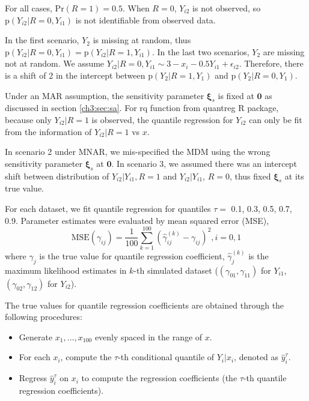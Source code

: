 \documentclass[useAMS,usenatbib,referee]{biom}
\newcommand{\pr}{\mbox{p}}
\newcommand{\prob}{\mbox{Pr}}
\begin{document}
For all cases, $\prob (R = 1) = 0.5$.
When $R = 0$, $Y_{i2}$ is not observed, so $\pr(Y_{i2}| R = 0, Y_{i1})$ is not identifiable from observed data.

In the first scenario, $Y_2$ is missing at random, thus $\pr(Y_{i2} | R = 0, Y_{i1}) = \pr(Y_{i2}|R = 1, Y_{i1}) $.
In the last two scenarios, $Y_2$ are missing not at random.
We assume $Y_{i2}| R = 0, Y_{i1} \sim 3 - x_i - 0.5Y_{i1} + \epsilon_{i2}$.
Therefore, there is a shift of 2 in the intercept between $\pr(Y_2|R = 1, Y_1)$ and $\pr(Y_2|R = 0, Y_1)$.

Under an MAR assumption, the sensitivity parameter $\bm \xi_s$ is fixed at $\bm 0$ as discussed in section \ref{ch3:sec:sa}.
For rq function from quantreg R package, because only $Y_{i2}|R = 1$ is observed, the quantile regression for $Y_{i2}$ can only be fit from the information of $Y_{i2}|R = 1$ vs $x$.

In scenario 2 under MNAR, we mis-specified the MDM using the wrong sensitivity parameter $\bm \xi_s$ at $\bm 0$.
In scenario 3, we assumed there was an intercept shift between distribution of $Y_{i2}|Y_{i1}, R = 1$ and $Y_{i2}|Y_{i1}$, $R = 0$, thus fixed $\bm \xi_s$ at its true value.

For each dataset, we fit quantile regression for quantiles $\tau =$ 0.1, 0.3, 0.5, 0.7, 0.9.
Parameter estimates were evaluated by mean squared error (MSE),
\begin{displaymath}
  \mbox{MSE} (\gamma_{ij}) = \frac{1}{100} \sum_{k = 1}^{100}
  \left( \hat{\gamma}_{ij}^{(k)}  - \gamma_{ij}\right)^2, i = 0, 1
\end{displaymath}
where $\gamma_{j}$ is the true value for quantile regression
coefficient, $\hat{\gamma}_{j}^{(k)}$ is the maximum likelihood
estimates in $k$-th simulated dataset ($(\gamma_{01}, \gamma_{11})$
for $Y_{i1}$, $(\gamma_{02}, \gamma_{12})$ for $Y_{i2}$).

The true values for quantile regression coefficients are obtained through the following procedures:
\begin{itemize}
\item Generate $x_1, \ldots, x_{100}$ evenly spaced in the range of $x$.
\item For each $x_i$, compute the $\tau$-th conditional quantile of $Y_i | x_i$, denoted as $\hat{y}_i^{\tau}$.
\item Regress $\hat{y}_i^{\tau}$ on $x_i$ to compute the regression coefficients (the $\tau$-th quantile regression coefficients).
\end{itemize}
\end{document}
